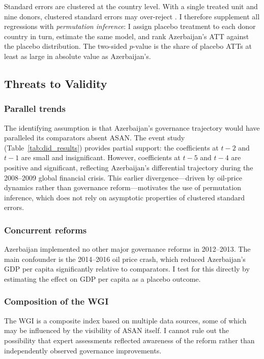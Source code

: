 \documentclass[12pt]{article}
\begin{document}
Standard errors are clustered at the country level. With a single treated unit and nine donors, clustered standard errors may over-reject \citep{abadie2010synthetic}. I therefore supplement all regressions with \textit{permutation inference}: I assign placebo treatment to each donor country in turn, estimate the same model, and rank Azerbaijan's ATT against the placebo distribution. The two-sided $p$-value is the share of placebo ATTs at least as large in absolute value as Azerbaijan's.

\subsection{Threats to Validity}

\subsubsection*{Parallel trends} The identifying assumption is that Azerbaijan's governance trajectory would have paralleled its comparators absent ASAN. The event study (Table~\ref{tab:did_results}) provides partial support: the coefficients at $t-2$ and $t-1$ are small and insignificant. However, coefficients at $t-5$ and $t-4$ are positive and significant, reflecting Azerbaijan's differential trajectory during the 2008--2009 global financial crisis. This earlier divergence---driven by oil-price dynamics rather than governance reform---motivates the use of permutation inference, which does not rely on asymptotic properties of clustered standard errors.

\subsubsection*{Concurrent reforms} Azerbaijan implemented no other major governance reforms in 2012--2013. The main confounder is the 2014--2016 oil price crash, which reduced Azerbaijan's GDP per capita significantly relative to comparators. I test for this directly by estimating the effect on GDP per capita as a placebo outcome.

\subsubsection*{Composition of the WGI} The WGI is a composite index based on multiple data sources, some of which may be influenced by the visibility of ASAN itself. I cannot rule out the possibility that expert assessments reflected awareness of the reform rather than independently observed governance improvements.
\end{document}
